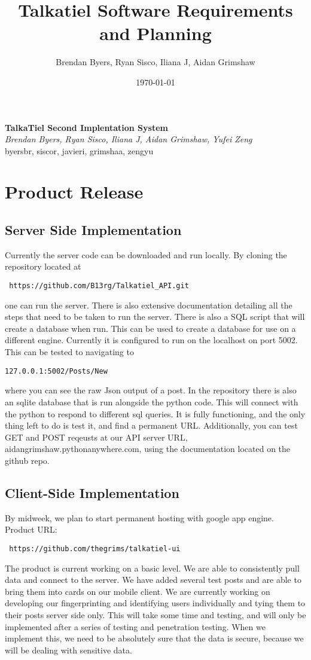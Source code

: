 \documentclass[12pt]{article}
\title{Talkatiel Software Requirements and Planning}
\author{Brendan Byers, Ryan Sisco, Iliana J, Aidan Grimshaw}
\date{\today}
\begin{document}
\begin{center}
 \Large\textbf{TalkaTiel Second Implentation System}\\
 \large\textit{Brendan Byers, Ryan Sisco, Iliana J, Aidan Grimshaw, Yufei Zeng}\\
 \large{byersbr, siscor, javieri, grimshaa, zengyu}\\
\end{center}

\tableofcontents
\section{Product Release} \subsection{Server Side Implementation} Currently the
server code can be downloaded and run locally.  By cloning the repository
located at\begin{verbatim} https://github.com/B13rg/Talkatiel_API.git
\end{verbatim}one can run the server.  There is also extensive documentation
detailing all the steps that need to be taken to run the server.  There is also
a SQL script that will create a database when run.  This can be used to create a
database for use on a different engine.  Currently it is configured to run on
the localhost on port 5002.  This can be tested to navigating to
\begin{verbatim}127.0.0.1:5002/Posts/New \end{verbatim}where you can see the raw
Json output of a post.  In the repository there is also an sqlite database that
is run alongside the python code.  This will connect with the python to respond
to different sql queries.  It is fully functioning, and the only thing left to
do is test it, and find a permanent URL. Additionally, you can test GET and POST
reqeusts at our API server URL, aidangrimshaw.pythonanywhere.com, using the
documentation located on the github repo.

\subsection{Client-Side Implementation}
By midweek, we plan to start permanent
hosting with google app engine.
Product URL:\begin{verbatim} https://github.com/thegrims/talkatiel-ui \end{verbatim}
The product is current working on a basic level. We are able to consistently pull data and connect to the server. We have added several test posts and are able to bring them into cards on our mobile client. We are currently working on developing our fingerprinting and identifying users individually and tying them to their posts server side only. This will take some time and testing, and will only be implemented after a series of testing and penetration testing. When we implement this, we need to be absolutely sure that the data is secure, because we will be dealing with sensitive data. 
\end{document}
